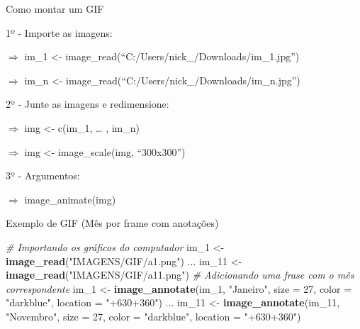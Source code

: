 \documentclass[
  ignorenonframetext,
]{beamer}
\newenvironment{Shaded}{\begin{snugshade}}{\end{snugshade}}
\newcommand{\CommentTok}[1]{\textcolor[rgb]{0.56,0.35,0.01}{\textit{#1}}}
\newcommand{\DataTypeTok}[1]{\textcolor[rgb]{0.13,0.29,0.53}{#1}}
\newcommand{\DecValTok}[1]{\textcolor[rgb]{0.00,0.00,0.81}{#1}}
\newcommand{\KeywordTok}[1]{\textcolor[rgb]{0.13,0.29,0.53}{\textbf{#1}}}
\newcommand{\NormalTok}[1]{#1}
\newcommand{\StringTok}[1]{\textcolor[rgb]{0.31,0.60,0.02}{#1}}
\begin{document}
\begin{frame}{Como montar um GIF}
\protect\hypertarget{como-montar-um-gif}{}

1º - Importe as imagens:

\(\Rightarrow\) im\_1 \textless-
image\_read(``C:/Users/nick\_/Downloads/im\_1.jpg'')

\(\Rightarrow\) im\_n \textless-
image\_read(``C:/Users/nick\_/Downloads/im\_n.jpg'')

2º - Junte as imagens e redimensione:

\(\Rightarrow\) img \textless- c(im\_1, \ldots{} , im\_n)

\(\Rightarrow\) img \textless- image\_scale(img, ``300x300'')

3º - Argumentos:

\(\Rightarrow\) image\_animate(img)

\end{frame}

\begin{frame}[fragile]{Exemplo de GIF (Mês por frame com anotações)}
\protect\hypertarget{exemplo-de-gif-muxeas-por-frame-com-anotauxe7uxf5es}{}

\begin{Shaded}
\begin{Highlighting}[]
\CommentTok{# Importando os gráficos do computador}
\NormalTok{im_}\DecValTok{1}\NormalTok{ <-}\StringTok{ }\KeywordTok{image_read}\NormalTok{(}\StringTok{"IMAGENS/GIF/a1.png"}\NormalTok{)}
\NormalTok{...}
\NormalTok{im_}\DecValTok{11}\NormalTok{ <-}\StringTok{ }\KeywordTok{image_read}\NormalTok{(}\StringTok{"IMAGENS/GIF/a11.png"}\NormalTok{)}
\CommentTok{# Adicionando uma frase com o mês correspondente}
\NormalTok{im_}\DecValTok{1}\NormalTok{ <-}\StringTok{ }\KeywordTok{image_annotate}\NormalTok{(im_}\DecValTok{1}\NormalTok{, }\StringTok{"Janeiro"}\NormalTok{, }\DataTypeTok{size =} \DecValTok{27}\NormalTok{,}
                             \DataTypeTok{color =} \StringTok{"darkblue"}\NormalTok{,}
                             \DataTypeTok{location =} \StringTok{"+630+360"}\NormalTok{)}
\NormalTok{...}
\NormalTok{im_}\DecValTok{11}\NormalTok{ <-}\StringTok{ }\KeywordTok{image_annotate}\NormalTok{(im_}\DecValTok{11}\NormalTok{, }\StringTok{"Novembro"}\NormalTok{, }\DataTypeTok{size =} \DecValTok{27}\NormalTok{,}
                             \DataTypeTok{color =} \StringTok{"darkblue"}\NormalTok{,}
                             \DataTypeTok{location =} \StringTok{"+630+360"}\NormalTok{)}
\end{Highlighting}
\end{Shaded}

\end{frame}
\end{document}
